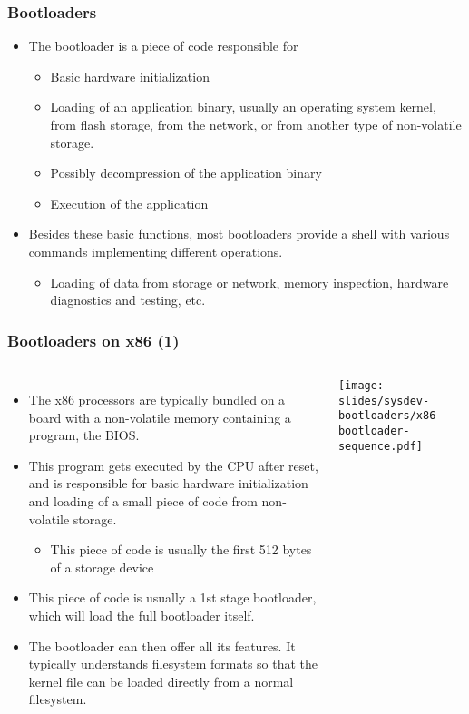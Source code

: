 
\begin{frame}
  \frametitle{Bootloaders}
  \begin{itemize}
  \item The bootloader is a piece of code responsible for
    \begin{itemize}
    \item Basic hardware initialization
    \item Loading of an application binary, usually an operating
      system kernel, from flash storage, from the network, or from
      another type of non-volatile storage.
    \item Possibly decompression of the application binary
    \item Execution of the application
    \end{itemize}
  \item Besides these basic functions, most bootloaders provide a
    shell with various commands implementing different operations.
    \begin{itemize}
    \item Loading of data from storage or network, memory inspection,
      hardware diagnostics and testing, etc.
    \end{itemize}
  \end{itemize}
\end{frame}

\begin{frame}
  \frametitle{Bootloaders on x86 (1)}
  \begin{columns}
    \begin{itemize}
    \item The x86 processors are typically bundled on a board with a
      non-volatile memory containing a program, the BIOS.
    \item This program gets executed by the CPU after reset, and is
      responsible for basic hardware initialization and loading of a
      small piece of code from non- volatile storage.
      \begin{itemize}
      \item This piece of code is usually the first 512 bytes of a
        storage device
      \end{itemize}
    \item This piece of code is usually a 1st stage bootloader, which
      will load the full bootloader itself.
    \item The bootloader can then offer all its features. It typically
      understands filesystem formats so that the kernel file can be
      loaded directly from a normal filesystem.
    \end{itemize}
    \texttt{[image: slides/sysdev-bootloaders/x86-bootloader-sequence.pdf]}
  \end{columns}
\end{frame}

